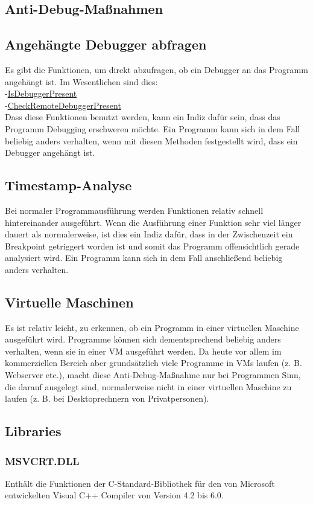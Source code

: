 \begin{multicols}{3}
\section{Anti-Debug-Maßnahmen}
\subsection{Angehängte Debugger abfragen}
Es gibt die Funktionen, um direkt abzufragen, ob ein Debugger an das Programm angehängt ist. Im Wesentlichen sind dies:\\
-\href{https://msdn.microsoft.com/en-us/library/ms680345(VS.85).aspx}{IsDebuggerPresent} \\
-\href{https://msdn.microsoft.com/en-us/library/ms679280(VS.85).aspx}{CheckRemoteDebuggerPresent} \\
Dass diese Funktionen benutzt werden, kann ein Indiz dafür sein, dass das Programm Debugging erschweren möchte. Ein Programm kann sich in dem Fall beliebig anders verhalten, wenn mit diesen Methoden festgestellt wird, dass ein Debugger angehängt ist.
\subsection{Timestamp-Analyse}
Bei normaler Programmausführung werden Funktionen relativ schnell hintereinander ausgeführt. Wenn die Ausführung einer Funktion sehr viel länger dauert als normalerweise, ist dies ein Indiz dafür, dass in der Zwischenzeit ein Breakpoint getriggert worden ist und somit das Programm offensichtlich gerade analysiert wird. Ein Programm kann sich in dem Fall anschließend beliebig anders verhalten.
\subsection{Virtuelle Maschinen}
Es ist relativ leicht, zu erkennen, ob ein Programm in einer virtuellen Maschine ausgeführt wird. Programme können sich dementsprechend beliebig anders verhalten, wenn sie in einer VM ausgeführt werden. Da heute vor allem im kommerziellen Bereich aber grundsätzlich viele Programme in VMs laufen (z. B. Webserver etc.), macht diese Anti-Debug-Maßnahme nur bei Programmen Sinn, die darauf ausgelegt sind, normalerweise nicht in einer virtuellen Maschine zu laufen (z. B. bei Desktoprechnern von Privatpersonen).
\subsection{Libraries}
\subsubsection{MSVCRT.DLL}
Enthält die Funktionen der C-Standard-Bibliothek für den von Microsoft entwickelten Visual C++ Compiler von Version 4.2 bis 6.0.
\end{multicols}